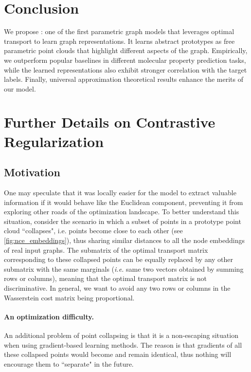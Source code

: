 \documentclass[letterpaper]{article} \usepackage{aaai22}  \usepackage{times}  \usepackage{helvet}  \usepackage{courier}  \usepackage[hyphens]{url}  \usepackage{graphicx} \urlstyle{rm} \def\UrlFont{\rm}  \usepackage{natbib}  \usepackage{caption} \DeclareCaptionStyle{ruled}{labelfont=normalfont,labelsep=colon,strut=off} \frenchspacing  \setlength{\pdfpagewidth}{8.5in}  \setlength{\pdfpageheight}{11in}  \usepackage{algorithm}
\begin{document}
\section{Conclusion}
We propose : one of the first parametric graph models that leverages optimal transport to learn graph representations. It learns abstract prototypes as free parametric point clouds that highlight different aspects of the graph. Empirically, we outperform popular baselines in different molecular property prediction tasks, while the learned representations also exhibit stronger correlation with the target labels. Finally, universal approximation theoretical results enhance the merits of our model.

\appendix

\clearpage

\section{Further Details on Contrastive Regularization}
\subsection{Motivation}\label{sec:discussion-nce}

One may speculate that it was locally easier for the model to extract valuable information if it would behave like the Euclidean component, preventing it from exploring other roads of the optimization landscape. To better understand this situation, consider the scenario in which a subset of points in a prototype point cloud ``collapses", i.e. points become close to each other (see \cref{fig:nce_embeddings}), thus sharing similar distances to all the node embeddings of real input graphs. The submatrix of the optimal transport matrix corresponding to these collapsed points can be equally replaced by any other submatrix with the same marginals (\textit{i.e.} same two vectors obtained by summing rows or columns), meaning that the optimal transport matrix is not discriminative. In general, we want to avoid any two rows or columns in the Wasserstein cost matrix being proportional. 

\paragraph{An optimization difficulty.} An additional problem of point collapsing is that it is a non-escaping situation when using gradient-based learning methods. The reason is that gradients of all these collapsed points would become and remain identical, thus nothing will encourage them to ``separate" in the future.
\end{document}
